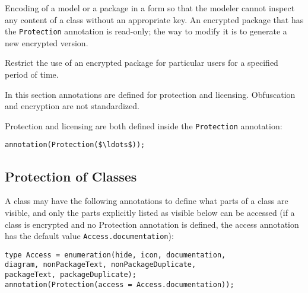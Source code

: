 \begin{definition}[Encryption]
Encoding of a model or a package in a form so that the modeler cannot inspect any content of a class without an appropriate key.  An encrypted package that has the \lstinline!Protection! annotation
is read-only; the way to modify it is to generate a new encrypted version.
\end{definition}

\begin{definition}[Licensing]
Restrict the use of an encrypted package for particular users for a specified period of time.
\end{definition}

In this section annotations are defined for protection and licensing.  Obfuscation and encryption are not standardized.

Protection and licensing are both defined inside the \lstinline!Protection! annotation:
\begin{lstlisting}[language=modelica]
annotation(Protection($\ldots$));
\end{lstlisting}

\subsection{Protection of Classes}\label{protection-of-classes}

A class may have the following annotations to define what parts of a
class are visible, and only the parts explicitly listed as visible below can be accessed
(if a class is encrypted and no Protection annotation is defined, the access annotation has the default value
\lstinline!Access.documentation!):
\begin{lstlisting}[language=modelica]
type Access = enumeration(hide, icon, documentation,
diagram, nonPackageText, nonPackageDuplicate,
packageText, packageDuplicate);
annotation(Protection(access = Access.documentation));
\end{lstlisting}

